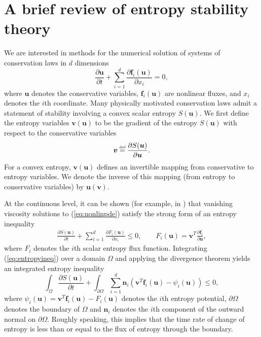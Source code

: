 \documentclass[review,onefignum,onetabnum,final]{siamart171218}
\newcommand{\pd}[2]{\frac{\partial#1}{\partial#2}}
\newcommand{\LRp}[1]{\left( #1 \right)}
\newcommand\myeq{\mathrel{\stackrel{\makebox[0pt]{\mbox{\normalfont\tiny def}}}{=}}}
\begin{document}
\section{A brief review of entropy stability theory}
\label{sec:0}

We are interested in methods for the numerical solution of systems of conservation laws in $d$ dimensions
\begin{equation}
\pd{\bm{u}}{t} + \sum_{i=1}^d \pd{\bm{f}_i\LRp{\bm{u}}}{x_i} = 0,
\label{eq:nonlinpde}
\end{equation}
where $\bm{u}$ denotes the conservative variables, $\bm{f}_i(\bm{u})$ are nonlinear fluxes, and $x_i$ denotes the $i$th coordinate.  Many physically motivated conservation laws admit a statement of stability involving a convex scalar entropy $S(\bm{u})$.  We first define the entropy variables $\bm{v}(\bm{u})$ to be the gradient of the entropy $S(\bm{u})$ with respect to the conservative variables 
\[
\bm{v} \myeq \pd{S(\bm{u})}{\bm{u}}.  
\]
For a convex entropy, $\bm{v}(\bm{u})$ defines an invertible mapping from conservative to entropy variables.  We denote the inverse of this mapping (from entropy to conservative variables) by $\bm{u}(\bm{v})$.  

At the continuous level, it can be shown (for example, in \cite{dafermos2005compensated}) that vanishing viscosity solutions to (\ref{eq:nonlinpde}) satisfy the strong form of an entropy inequality 
\begin{gather}
\pd{S(\bm{u})}{t} + \sum_{i=1}^d \pd{F_i(\bm{u})}{x_i} \leq 0, \qquad F_i(\bm{u}) = \bm{v}^T\pd{\bm{f}_i}{\bm{u}}, 
\label{eq:entropyineq}
\end{gather}
where $F_i$ denotes the $i$th scalar entropy flux function.  Integrating (\ref{eq:entropyineq}) over a domain $\Omega$ and applying the divergence theorem yields an integrated entropy inequality
\begin{equation}
\int_{\Omega} \pd{S(\bm{u})}{t} + \int_{\partial \Omega} \sum_{i=1}^d \bm{n}_i \LRp{\bm{v}^T\bm{f}_i(\bm{u}) - \psi_i(\bm{u})} \leq 0,
\label{eq:weakentropyineq}
\end{equation}
where $\psi_i(\bm{u}) = \bm{v}^T\bm{f}_i(\bm{u}) - F_i(\bm{u})$ denotes the $i$th entropy potential, $\partial \Omega$ denotes the boundary of $\Omega$ and $\bm{n}_i$ denotes the $i$th component of the outward normal on $\partial \Omega$.  Roughly speaking, this implies that the time rate of change of entropy is less than or equal to the flux of entropy through the boundary.
\end{document}
